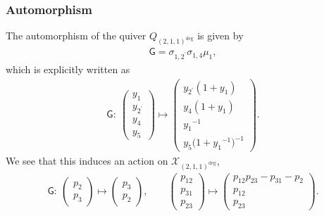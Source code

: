 \documentclass[pdftex]{sigma}
\numberwithin{equation}{section}
\begin{document}
\subsubsection*{Automorphism}
The automorphism of the quiver $Q_{(2,1,1)^{\text{deg}}}$ is given by
\begin{gather} \label{G_211deg}
 \mathsf{G} = \sigma_{1,2^\prime} \sigma_{1,4} \mu_1 ,
\end{gather}
which is explicitly written as
\begin{gather*}
 \mathsf{G} \colon \
 \begin{pmatrix}
 y_1 \\ y_{2^\prime} \\ y_4 \\ y_5
 \end{pmatrix}
 \mapsto
 \begin{pmatrix}
 y_{2^\prime} ( 1 + y_1 ) \\
 y_4 ( 1 + y_1 ) \\
 {y_1}^{-1} \\
 y_5 \big( 1+{y_{1}}^{-1} \big)^{-1}
 \end{pmatrix} .
\end{gather*}
We see that this induces an action on $\mathcal{X}_{(2,1,1)^{\text{deg}}}$,
\begin{gather*}
 \mathsf{G} \colon \
 \begin{pmatrix}
 p_2 \\ p_3
 \end{pmatrix}
 \mapsto
 \begin{pmatrix}
 p_3 \\ p_2
 \end{pmatrix} ,
 \qquad
 \begin{pmatrix}
 p_{12} \\ p_{31} \\ p_{23}
 \end{pmatrix}
 \mapsto
 \begin{pmatrix}
 p_{12} p_{23} - p_{31} - p_2 \\
 p_{12} \\
 p_{23}
 \end{pmatrix} .
\end{gather*}
\end{document}
